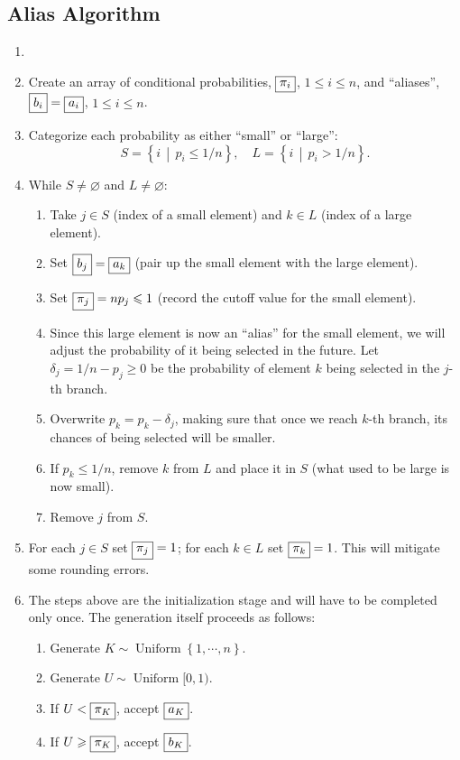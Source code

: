 \documentclass{article}
\renewcommand{\geq}{\geqslant}
\renewcommand{\leq}{\leqslant}
\theoremstyle{definition} %
\newenvironment{algorithm}[1]
  {\renewcommand\theAUXalgorithm{#1}\AUXalgorithm\begin{enumerate}\item[]}
  {\end{enumerate}\endAUXalgorithm}
\DeclareMathOperator{\DUnif}{\mathrm{Uniform}} %
\newcommand{\cache}[1]{\fbox{$#1$}}
\newcommand{\set}[1]{\left\{ {#1} \right\}} %
\newcommand{\cset}[3][\middle |]            %
    {\left\{ {#2} \, #1 \, {#3} \right\}}
\begin{document}
\subsection{Alias Algorithm}

\begin{algorithm}{(Continuous generators)}
    \item Create an array of conditional probabilities, $\cache{\pi _i }$, $1 \leq i \leq n$, and ``aliases'', $\cache{b_i} = \cache{a_i}$, $1 \leq i \leq n$.

    \item Categorize each probability as either ``small'' or ``large'':
        \[
            S = \cset{i}{p_i \leq 1/n}, \quad
            L = \cset{i}{p_i > 1/n}.
        \]

    \item While $S \neq \varnothing $ and $L \neq \varnothing $:
        \begin{enumerate}
            \item Take $j \in S$ (index of a small element) and $k \in L$ (index of a large element).
            \item Set $\cache{b_j} = \cache{a_k}$ (pair up the small element with the large element).
            \item Set $\cache{\pi _j} = n p_j \leq 1$ (record the cutoff value for the small element).
            \item Since this large element is now an ``alias'' for the small element, we will adjust the probability of it being selected in the future. Let $\delta _j = 1 / n - p_j \geq 0$ be the probability of element $k$ being selected in the $j$-th branch.
            \item Overwrite $p_k = p_k - \delta _j$, making sure that once we reach $k$-th branch, its chances of being selected will be smaller.
            \item If $p_k \leq 1 / n$, remove $k$ from $L$ and place it in $S$ (what used to be large is now small).
            \item Remove $j$ from $S$.
        \end{enumerate}

    \item For each $j \in S$ set $\cache{\pi _j} = 1$; for each $k \in L$ set $\cache{\pi _k} = 1$. This will mitigate some rounding errors.

    \item The steps above are the initialization stage and will have to be completed only once. The generation itself proceeds as follows:
        \begin{enumerate}
            \item Generate $K \sim \DUnif \set{1, \cdots , n}$.
            \item Generate $U \sim \DUnif [0, 1)$.
            \item If $U < \cache{\pi _K}$, accept $\cache{a_K}$.
            \item If $U \geq \cache{\pi _K}$, accept $\cache{b_K}$.
        \end{enumerate}
\end{algorithm}
\end{document}
